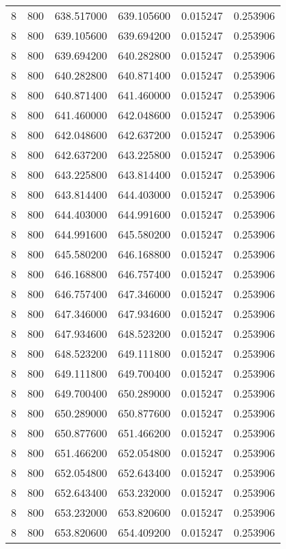 \begin{longtable}{rrrrrr}
8 & 800 & 638.517000 & 639.105600 & 0.015247 & 0.253906 \\
8 & 800 & 639.105600 & 639.694200 & 0.015247 & 0.253906 \\
8 & 800 & 639.694200 & 640.282800 & 0.015247 & 0.253906 \\
8 & 800 & 640.282800 & 640.871400 & 0.015247 & 0.253906 \\
8 & 800 & 640.871400 & 641.460000 & 0.015247 & 0.253906 \\
8 & 800 & 641.460000 & 642.048600 & 0.015247 & 0.253906 \\
8 & 800 & 642.048600 & 642.637200 & 0.015247 & 0.253906 \\
8 & 800 & 642.637200 & 643.225800 & 0.015247 & 0.253906 \\
8 & 800 & 643.225800 & 643.814400 & 0.015247 & 0.253906 \\
8 & 800 & 643.814400 & 644.403000 & 0.015247 & 0.253906 \\
8 & 800 & 644.403000 & 644.991600 & 0.015247 & 0.253906 \\
8 & 800 & 644.991600 & 645.580200 & 0.015247 & 0.253906 \\
8 & 800 & 645.580200 & 646.168800 & 0.015247 & 0.253906 \\
8 & 800 & 646.168800 & 646.757400 & 0.015247 & 0.253906 \\
8 & 800 & 646.757400 & 647.346000 & 0.015247 & 0.253906 \\
8 & 800 & 647.346000 & 647.934600 & 0.015247 & 0.253906 \\
8 & 800 & 647.934600 & 648.523200 & 0.015247 & 0.253906 \\
8 & 800 & 648.523200 & 649.111800 & 0.015247 & 0.253906 \\
8 & 800 & 649.111800 & 649.700400 & 0.015247 & 0.253906 \\
8 & 800 & 649.700400 & 650.289000 & 0.015247 & 0.253906 \\
8 & 800 & 650.289000 & 650.877600 & 0.015247 & 0.253906 \\
8 & 800 & 650.877600 & 651.466200 & 0.015247 & 0.253906 \\
8 & 800 & 651.466200 & 652.054800 & 0.015247 & 0.253906 \\
8 & 800 & 652.054800 & 652.643400 & 0.015247 & 0.253906 \\
8 & 800 & 652.643400 & 653.232000 & 0.015247 & 0.253906 \\
8 & 800 & 653.232000 & 653.820600 & 0.015247 & 0.253906 \\
8 & 800 & 653.820600 & 654.409200 & 0.015247 & 0.253906 \\

\end{longtable}
